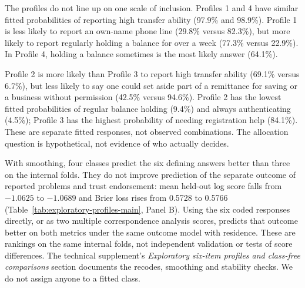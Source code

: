 The profiles do not line up on one scale of inclusion. Profiles 1 and 4 have similar fitted probabilities of reporting high transfer ability (97.9\% and 98.9\%). Profile 1 is less likely to report an own-name phone line (29.8\% versus 82.3\%), but more likely to report regularly holding a balance for over a week (77.3\% versus 22.9\%). In Profile 4, holding a balance sometimes is the most likely answer (64.1\%).

Profile 2 is more likely than Profile 3 to report high transfer ability (69.1\% versus 6.7\%), but less likely to say one could set aside part of a remittance for saving or a business without permission (42.5\% versus 94.6\%). Profile 2 has the lowest fitted probabilities of regular balance holding (9.4\%) and always authenticating (4.5\%); Profile 3 has the highest probability of needing registration help (84.1\%). These are separate fitted responses, not observed combinations. The allocation question is hypothetical, not evidence of who actually decides.

With smoothing, four classes predict the six defining answers better than three on the internal folds. They do not improve prediction of the separate outcome of reported problems and trust endorsement: mean held-out log score falls from $-1.0625$ to $-1.0689$ and Brier loss rises from 0.5728 to 0.5766 (Table~\ref{tab:exploratory-profiles-main}, Panel B). Using the six coded responses directly, or as two multiple correspondence analysis scores, predicts that outcome better on both metrics under the same outcome model with residence. These are rankings on the same internal folds, not independent validation or tests of score differences. The technical supplement's \emph{Exploratory six-item profiles and class-free comparisons} section documents the recodes, smoothing and stability checks. We do not assign anyone to a fitted class.



\clearpage
